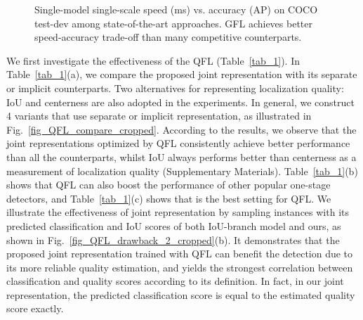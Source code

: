 \documentclass{article}
\begin{document}
\begin{wrapfigure}{r}{0.44\textwidth}
	\vspace{-18pt}
	\begin{center}
		\setlength{\fboxrule}{0pt}
	\end{center}	
	\vspace{-12pt}
	\caption{Single-model single-scale speed (ms) vs. accuracy (AP) on COCO test-dev among state-of-the-art approaches. GFL achieves better speed-accuracy trade-off than many competitive counterparts.}
	\label{fig_sota}
	\vspace{-8pt}
\end{wrapfigure}
We first investigate the effectiveness of the QFL (Table~\ref{tab_1}). In Table~\ref{tab_1}(a), we compare the proposed joint representation with its separate or implicit counterparts. Two alternatives for representing localization quality: IoU \cite{wu2020iou,jiang2018acquisition} and centerness \cite{tian2019fcos,zhang2019bridging} are also adopted in the experiments. In general, we construct 4 variants that use separate or implicit representation, as illustrated in Fig.~\ref{fig_QFL_compare_cropped}. According to the results, we observe that the joint representations optimized by QFL consistently achieve better performance than all the counterparts, whilst IoU always performs better than centerness as a measurement of localization quality ({Supplementary Materials}). Table~\ref{tab_1}(b) shows that QFL can also boost the performance of other popular one-stage detectors, and Table~\ref{tab_1}(c) shows that  is the best setting for QFL. We illustrate the effectiveness of joint representation by sampling instances with its predicted classification and IoU scores of both IoU-branch model and ours, as shown in Fig.~\ref{fig_QFL_drawback_2_cropped}(b). It demonstrates that the proposed joint representation trained with QFL can benefit the detection due to its more reliable quality estimation, and yields the strongest correlation between classification and quality scores according to its definition. In fact, in our joint representation, the predicted classification score is equal to the estimated quality score exactly.
\end{document}

